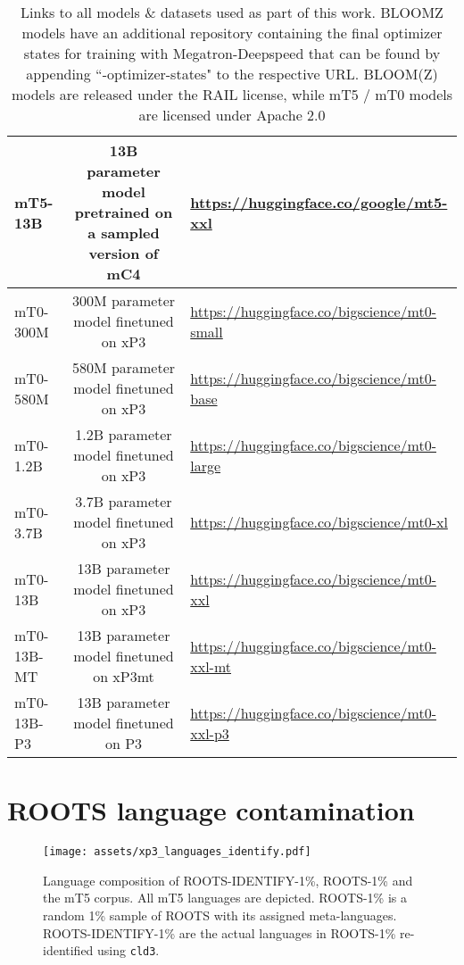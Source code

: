 \documentclass[11pt]{article}
\begin{document}
\begin{table*}[htbp]
{\begin{tabular}{@{}l|c|l@{}}
mT5-13B & 13B parameter model pretrained on a sampled version of mC4 & \url{https://huggingface.co/google/mt5-xxl} \\
\midrule
mT0-300M & 300M parameter model finetuned on xP3 & \url{https://huggingface.co/bigscience/mt0-small} 
\\
mT0-580M & 580M parameter model finetuned on xP3 & \url{https://huggingface.co/bigscience/mt0-base} 
\\
mT0-1.2B & 1.2B parameter model finetuned on xP3 & \url{https://huggingface.co/bigscience/mt0-large} 
\\
mT0-3.7B & 3.7B parameter model finetuned on xP3 & \url{https://huggingface.co/bigscience/mt0-xl} 
\\
mT0-13B & 13B parameter model finetuned on xP3 & \url{https://huggingface.co/bigscience/mt0-xxl} 
\\
mT0-13B-MT & 13B parameter model finetuned on xP3mt & \url{https://huggingface.co/bigscience/mt0-xxl-mt} 
\\
mT0-13B-P3 & 13B parameter model finetuned on P3 & \url{https://huggingface.co/bigscience/mt0-xxl-p3} 
\\
    \bottomrule
    \end{tabular}}
    \caption{Links to all models \& datasets used as part of this work. BLOOMZ models have an additional repository containing the final optimizer states for training with Megatron-Deepspeed that can be found by appending ``-optimizer-states" to the respective URL. BLOOM(Z) models are released under the RAIL license, while mT5 / mT0 models are licensed under Apache 2.0}
    \label{tab:ckpts}
\end{table*}

\FloatBarrier

\section{ROOTS language contamination}
\label{sec:contamination}

\begin{figure*}[htbp]
    \centering
    \begin{center}
        \texttt{[image: assets/xp3\_languages\_identify.pdf]}
        \caption{Language composition of ROOTS-IDENTIFY-1\%, ROOTS-1\% and the mT5 corpus. All mT5 languages are depicted. ROOTS-1\% is a random 1\% sample of ROOTS with its assigned meta-languages. ROOTS-IDENTIFY-1\% are the actual languages in ROOTS-1\% re-identified using \texttt{cld3}.}
        \label{fig:roots-identity-langs}
    \end{center}
\end{figure*}
\end{document}
